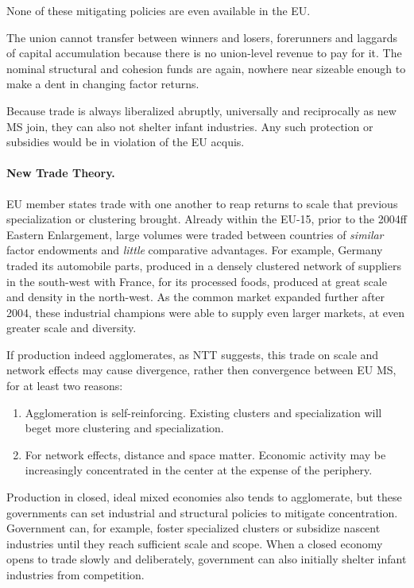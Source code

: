 \documentclass[11pt,a4paper,oneside,openright]{article}
\begin{document}
None of these mitigating policies are even available in the EU. 

The union cannot transfer between winners and losers, forerunners and laggards of capital accumulation because there is no union-level revenue to pay for it. 
The nominal structural and cohesion funds are again, nowhere near sizeable enough to make a dent in changing factor returns. 

Because trade is always liberalized abruptly, universally and reciprocally as new \gls{MS} join, they can also not shelter infant industries. 
Any such protection or subsidies would be in violation of the \gls{EU} acquis.

\paragraph{New Trade Theory.} 
\gls{EU} member states trade with one another to reap returns to scale that previous specialization or clustering brought. 
Already within the \gls{EU}-15, prior to the 2004ff Eastern Enlargement, large volumes were traded between countries of \emph{similar} factor endowments and \emph{little} comparative advantages. 
For example, Germany traded its automobile parts, produced in a densely clustered network of suppliers in the south-west with France, for its processed foods, produced at great scale and density in the north-west. As the common market expanded further after 2004, these industrial champions were able to supply even larger markets, at even greater scale and diversity. %

If production indeed agglomerates, as \gls{NTT} suggests, this trade on scale and network effects may cause divergence, rather then convergence between \gls{EU} \gls{MS}, for at least two reasons:
\begin{enumerate}
	\item Agglomeration is self-reinforcing. Existing clusters and specialization will beget more clustering and specialization. 
	\item For network effects, distance and space matter. Economic activity may be increasingly concentrated in the center at the expense of the periphery.
\end{enumerate}

Production in closed, ideal mixed economies also tends to agglomerate, but these governments can set industrial and structural policies to mitigate concentration. 
Government can, for example, foster specialized clusters or subsidize nascent industries until they reach sufficient scale and scope. 
When a closed economy opens to trade slowly and deliberately, government can also initially shelter infant industries from competition.
\end{document}
